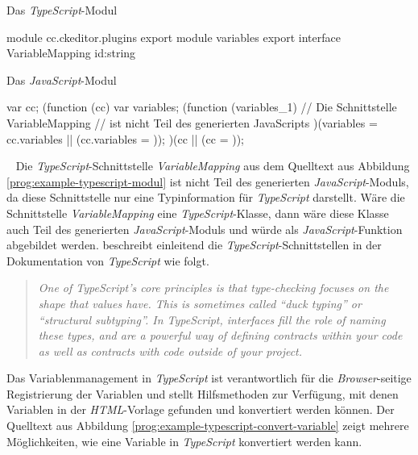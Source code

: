 \begin{program}[h]
\caption{Das \emph{TypeScript}-Modul}
\label{prog:example-typescript-modul}
\begin{JsCode}[numbers=none]
module cc.ckeditor.plugins {
	export module variables {
		export interface VariableMapping{
	        id:string
		}
	}
}                  
\end{JsCode}
\end{program}

\begin{program}[h]
\caption{Das \emph{JavaScript}-Modul}
\label{prog:example-javascript-modul}
\begin{JsCode}[numbers=none]
var cc;
(function (cc) {
    var variables;
    (function (variables_1) {
    // Die Schnittstelle VariableMapping 
    // ist nicht Teil des generierten JavaScripts
    })(variables = cc.variables || (cc.variables = {}));
})(cc || (cc = {}));                 
\end{JsCode}
\end{program}
\ \newline
Die \emph{TypeScript}-Schnittstelle \emph{VariableMapping} aus dem Quelltext aus Abbildung \ref{prog:example-typescript-modul} ist nicht Teil des generierten \emph{JavaScript}-Moduls, da diese Schnittstelle nur eine Typinformation für \emph{TypeScript} darstellt. Wäre die Schnittstelle \emph{VariableMapping} eine \emph{TypeScript}-Klasse, dann wäre diese Klasse auch Teil des generierten \emph{JavaScript}-Moduls und würde als \emph{JavaScript}-Funktion abgebildet werden.
\newline
\newline
\cite{typeScriptDoc} beschreibt einleitend die  \emph{TypeScript}-Schnittstellen in der Dokumentation von \emph{TypeScript} wie folgt.
\begin{quote}
	\emph{One of TypeScript’s core principles is that type-checking focuses on the shape that values have. This is sometimes called “duck typing” or “structural subtyping”. In TypeScript, interfaces fill the role of naming these types, and are a powerful way of defining contracts within your code as well as contracts with code outside of your project.}
\end{quote}
Das Variablenmanagement in \emph{TypeScript} ist verantwortlich für die \emph{Browser}-seitige Registrierung der Variablen und stellt Hilfsmethoden zur Verfügung, mit denen Variablen in der \emph{HTML}-Vorlage gefunden und konvertiert werden können. Der Quelltext aus Abbildung \ref{prog:example-typescript-convert-variable} zeigt mehrere Möglichkeiten, wie eine Variable in \emph{TypeScript} konvertiert werden kann.
\newpage

